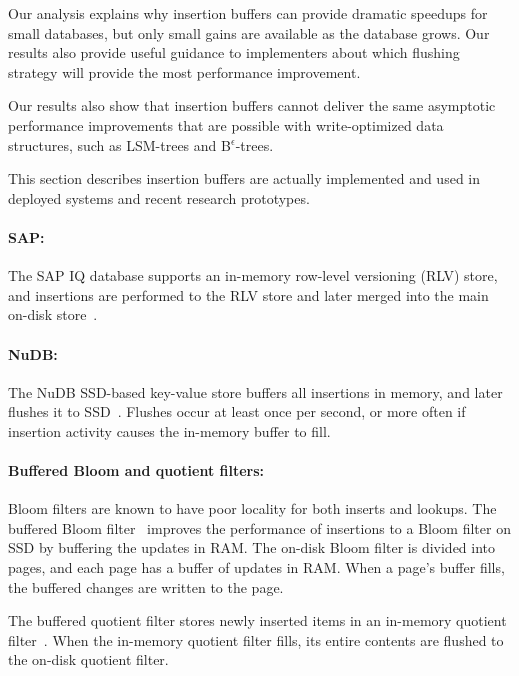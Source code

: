 Our analysis explains why insertion buffers can provide dramatic speedups for
small databases, but only small gains are available as the database grows.  Our
results also provide useful guidance to implementers about which flushing
strategy will provide the most performance improvement.

Our results also show that insertion buffers cannot deliver the same asymptotic
performance improvements that are possible with write-optimized data
structures, such as LSM-trees and B$^\epsilon$-trees.


This section describes insertion buffers are actually implemented and used in
deployed systems and recent research prototypes.

\paragraph{SAP:} The SAP IQ database supports an in-memory row-level versioning
(RLV) store, and insertions are performed to the RLV store and later merged
into the main on-disk store~\cite{SAP17}.  

\paragraph{NuDB:}  The NuDB SSD-based key-value store buffers all insertions in
memory, and later flushes it to SSD~\cite{NuDB16}.  Flushes occur at least once
per second, or more often if insertion activity causes the in-memory buffer to
fill.

\paragraph{Buffered Bloom and quotient filters:}  Bloom filters are known to
have poor locality for both inserts and lookups.  The buffered Bloom
filter~\cite{CanimLaMi10} improves the performance of insertions to a Bloom
filter on SSD by buffering the updates in RAM.  The on-disk Bloom filter is
divided into pages, and each page has a buffer of updates in RAM.  When a
page's buffer fills, the buffered changes are written to the page.  

The buffered quotient filter stores newly inserted items in an in-memory
quotient filter~\cite{BenderFaJo12,benderadaptivebloom}.  When the in-memory
quotient filter fills, its entire contents are flushed to the on-disk quotient
filter.

